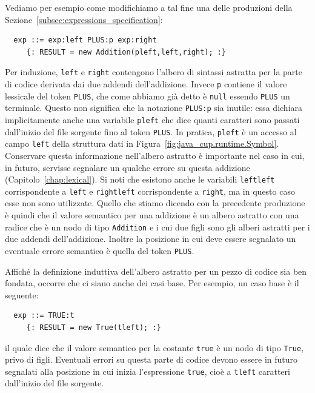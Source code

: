 Vediamo per esempio come modifichiamo a tal fine una delle produzioni
della Sezione~\ref{subsec:expressions_specification}:
%
\begin{verbatim}
  exp ::= exp:left PLUS:p exp:right
     {: RESULT = new Addition(pleft,left,right); :}
\end{verbatim}
%
Per induzione, \texttt{left} e \texttt{right} contengono l'albero
di sintassi astratta per la parte di codice derivata dai due addendi
dell'addizione. Invece \texttt{p} contiene il valore lessicale del
token \texttt{PLUS}, che come abbiamo gi\`a detto \`e \texttt{null}
essendo \texttt{PLUS} un terminale. Questo non significa che
la notazione \texttt{PLUS:p} sia inutile: essa dichiara implicitamente
anche una variabile \texttt{pleft} che dice quanti caratteri sono
passati dall'inizio del file sorgente fino al token \texttt{PLUS}. In pratica,
\texttt{pleft} \`e un accesso al campo \texttt{left} della struttura
dati in Figura~\ref{fig:java_cup.runtime.Symbol}.
Conservare questa informazione nell'albero astratto \`e importante nel caso
in cui, in futuro, servisse segnalare un qualche errore su questa
addizione (Capitolo~\ref{chap:lexical}).
Si noti che esistono anche le variabili \texttt{leftleft} corrispondente
a \texttt{left} e \texttt{rightleft} corrispondente a \texttt{right}, ma
in questo caso esse non sono utilizzate. Quello che stiamo
dicendo con la precedente produzione \`e quindi
che il valore semantico per una addizione \`e un
albero astratto con una radice che \`e un nodo di tipo \texttt{Addition}
e i cui due figli sono gli alberi astratti per i due addendi dell'addizione.
Inoltre la posizione in cui deve essere segnalato un eventuale errore
semantico \`e quella del token \texttt{PLUS}.

Affich\'e la definizione induttiva dell'albero astratto per un pezzo di codice
sia ben fondata, occorre che ci siano anche dei casi base. Per esempio,
un caso base \`e il seguente:
%
\begin{verbatim}
  exp ::= TRUE:t
     {: RESULT = new True(tleft); :}
\end{verbatim}
%
il quale dice che il valore semantico per la costante \texttt{true}
\`e un nodo di tipo \texttt{True}, privo di figli. Eventuali
errori su questa parte di codice devono essere in futuro segnalati
alla posizione in cui inizia l'espressione \texttt{true}, cio\`e a
\texttt{tleft} caratteri dall'inizio del file sorgente.

